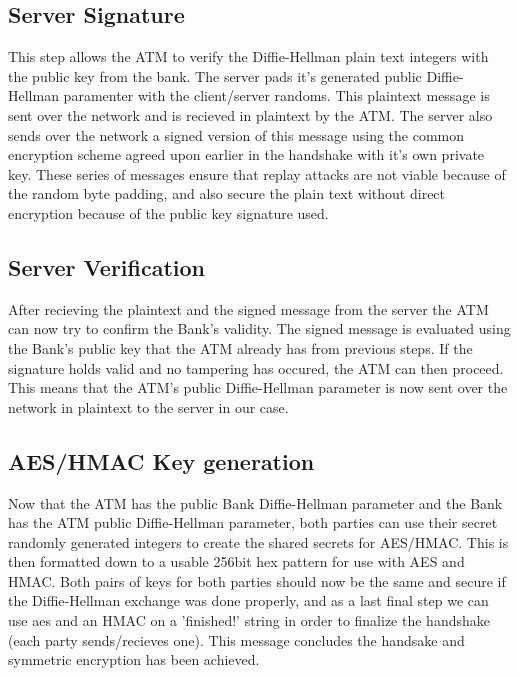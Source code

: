 \documentclass{article}
\begin{document}
	\subsection{Server Signature}\label{sec:servsig}
		This step allows the ATM to verify the Diffie-Hellman plain text integers with the public key from the bank. The server pads it's generated public Diffie-Hellman
		paramenter with the client/server randoms. This plaintext message is sent over the network and is recieved in plaintext by the ATM. The server also sends over the network a signed version of this message using the common encryption scheme agreed upon earlier in the handshake with it's own private key. These series of messages ensure that replay attacks are not viable because of the random byte padding, and also secure the plain text without direct encryption because of the public key signature used.
		
	\subsection{Server Verification}\label{sec:servconf}
		After recieving the plaintext and the signed message from the server the ATM can now try to confirm the Bank's validity. The signed message is evaluated using the Bank's public key that the ATM already has from previous steps. If the signature holds valid and no tampering has occured, the ATM can then proceed. This means that the ATM's public Diffie-Hellman parameter is now sent over the network in plaintext to the server in our case.
	
	\subsection{AES/HMAC Key generation}\label{sec:keygen}
		Now that the ATM has the public Bank Diffie-Hellman parameter and the Bank has the ATM public Diffie-Hellman parameter, both parties can use their secret randomly generated integers to create the shared secrets for AES/HMAC. This is then formatted down to a usable 256bit hex pattern for use with AES and HMAC. Both pairs of keys for both parties should now be the same and secure if the Diffie-Hellman exchange was done properly, and as a last final step we can use aes and an HMAC on a 'finished!' string in order to finalize the handshake (each party sends/recieves one). This message concludes the handsake and symmetric encryption has been achieved.
\end{document}
